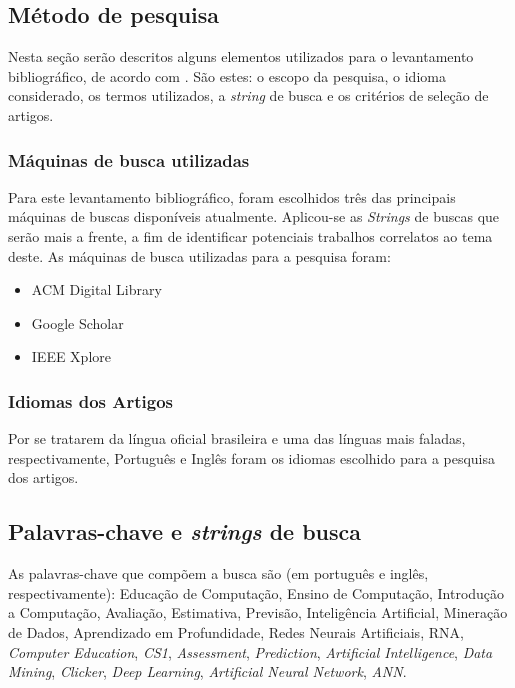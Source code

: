 \documentclass[
	12pt,				%
	openright,			%
	oneside,
	a4paper,			%
	english,			%
	french,				%
	spanish,			%
	brazil,				%
	]{abntex2}
\begin{document}
\subsection{Método de pesquisa}
\label{sec:MP}
Nesta seção serão descritos alguns elementos utilizados para o levantamento bibliográfico, de acordo com . São estes: o escopo da pesquisa, o idioma considerado, os termos utilizados, a \textit{string} de busca e os critérios de seleção de artigos.


\subsubsection{Máquinas de busca utilizadas}
Para este levantamento bibliográfico, foram escolhidos três das principais máquinas de buscas disponíveis atualmente. Aplicou-se as \textit{Strings} de buscas que serão mais a frente, a fim de identificar potenciais trabalhos correlatos ao tema deste. As máquinas de busca utilizadas para a pesquisa foram:
\begin{itemize}
    \item ACM Digital Library
    \item Google Scholar
    \item IEEE Xplore
\end{itemize}

\subsubsection{Idiomas dos Artigos}
Por se tratarem da língua oficial brasileira e uma das línguas mais faladas, respectivamente, Português e Inglês foram os idiomas escolhido para a pesquisa dos artigos.

\subsection{Palavras-chave e \textit{strings} de busca}

As palavras-chave que compõem a busca são (em português e inglês, respectivamente): 
Educação de Computação, Ensino de Computação, Introdução a Computação, Avaliação, Estimativa, Previsão, Inteligência Artificial, Mineração de Dados, Aprendizado em Profundidade, Redes Neurais Artificiais, RNA, \textit{Computer Education}, \textit{CS1}, \textit{Assessment}, \textit{Prediction}, \textit{Artificial Intelligence}, \textit{Data Mining}, \textit{Clicker}, \textit{Deep Learning}, \textit{Artificial Neural Network}, \textit{ANN}.
\end{document}
